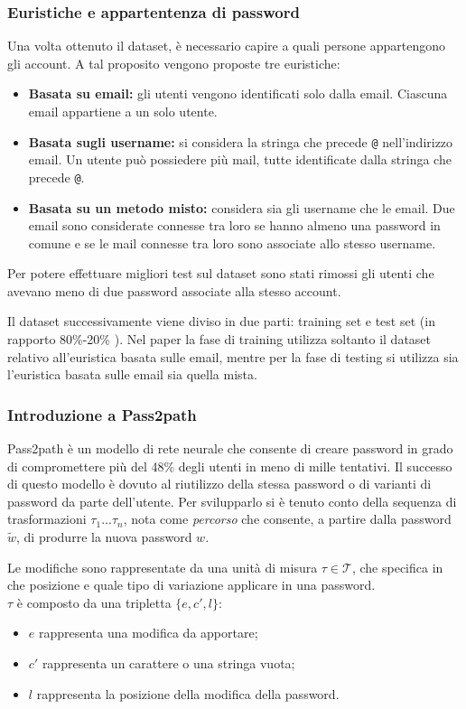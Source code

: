 \subsubsection{Euristiche e appartentenza di password}
Una volta ottenuto il dataset, è necessario capire a quali persone appartengono gli account. A tal proposito vengono proposte tre euristiche:
\begin{itemize}
    \item \textbf{Basata su email:} gli utenti vengono identificati solo dalla email. Ciascuna email appartiene a un solo utente.
    \item \textbf{Basata sugli username:} si considera la stringa che precede \texttt{@} nell'indirizzo email. Un utente può possiedere più mail, tutte identificate dalla stringa che precede \texttt{@}. 
    \item \textbf{Basata su un metodo misto:} considera sia gli username che le email. Due email sono considerate connesse tra loro se hanno almeno una password in comune e se le mail connesse tra loro sono associate allo stesso username.
\end{itemize}
Per potere effettuare migliori test sul dataset sono stati rimossi gli utenti che avevano meno di due password associate alla stesso account.

Il dataset successivamente viene diviso in due parti: training set e test set (in rapporto 80\%-20\% ). Nel paper la fase di training utilizza soltanto il dataset relativo all'euristica basata sulle email, mentre per la fase di testing si utilizza sia l'euristica basata sulle email sia quella mista.

\subsubsection{Introduzione a Pass2path}

Pass2path è un modello di rete neurale che consente di creare password in grado di compromettere più del 48\% degli utenti in meno di mille tentativi. Il successo di questo modello è dovuto al riutilizzo della stessa password o di varianti di password da parte dell'utente.
Per svilupparlo si è tenuto conto della sequenza di trasformazioni $\tau_1...\tau_n $, nota come \emph{percorso} che consente, a partire dalla password  $\tilde{w}$, di produrre la nuova password $w$. 


Le modifiche sono rappresentate da una unità di misura $\tau\in \mathcal{T}$, che specifica in che posizione e quale tipo di variazione applicare in una password.
\\
$\tau$ è composto da una tripletta  $\{e, c', l\}$:
\begin{itemize}
    \item $e$ rappresenta una modifica da apportare;
    \item $c'$ rappresenta un carattere o una stringa vuota;
    \item $l$ rappresenta la posizione della modifica della password.
\end{itemize}

